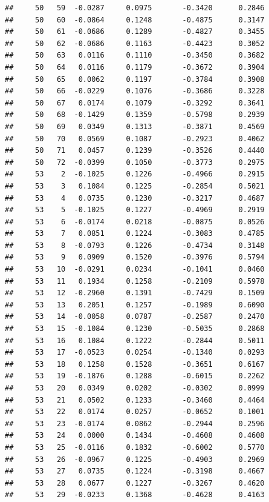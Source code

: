 \documentclass[
]{article}
\begin{document}
\begin{verbatim}
##     50   59  -0.0287     0.0975       -0.3420      0.2846  
##     50   60  -0.0864     0.1248       -0.4875      0.3147  
##     50   61  -0.0686     0.1289       -0.4827      0.3455  
##     50   62  -0.0686     0.1163       -0.4423      0.3052  
##     50   63   0.0116     0.1110       -0.3450      0.3682  
##     50   64   0.0116     0.1179       -0.3672      0.3904  
##     50   65   0.0062     0.1197       -0.3784      0.3908  
##     50   66  -0.0229     0.1076       -0.3686      0.3228  
##     50   67   0.0174     0.1079       -0.3292      0.3641  
##     50   68  -0.1429     0.1359       -0.5798      0.2939  
##     50   69   0.0349     0.1313       -0.3871      0.4569  
##     50   70   0.0569     0.1087       -0.2923      0.4062  
##     50   71   0.0457     0.1239       -0.3526      0.4440  
##     50   72  -0.0399     0.1050       -0.3773      0.2975  
##     53    2  -0.1025     0.1226       -0.4966      0.2915  
##     53    3   0.1084     0.1225       -0.2854      0.5021  
##     53    4   0.0735     0.1230       -0.3217      0.4687  
##     53    5  -0.1025     0.1227       -0.4969      0.2919  
##     53    6  -0.0174     0.0218       -0.0875      0.0526  
##     53    7   0.0851     0.1224       -0.3083      0.4785  
##     53    8  -0.0793     0.1226       -0.4734      0.3148  
##     53    9   0.0909     0.1520       -0.3976      0.5794  
##     53   10  -0.0291     0.0234       -0.1041      0.0460  
##     53   11   0.1934     0.1258       -0.2109      0.5978  
##     53   12  -0.2960     0.1391       -0.7429      0.1509  
##     53   13   0.2051     0.1257       -0.1989      0.6090  
##     53   14  -0.0058     0.0787       -0.2587      0.2470  
##     53   15  -0.1084     0.1230       -0.5035      0.2868  
##     53   16   0.1084     0.1222       -0.2844      0.5011  
##     53   17  -0.0523     0.0254       -0.1340      0.0293  
##     53   18   0.1258     0.1528       -0.3651      0.6167  
##     53   19  -0.1876     0.1288       -0.6015      0.2262  
##     53   20   0.0349     0.0202       -0.0302      0.0999  
##     53   21   0.0502     0.1233       -0.3460      0.4464  
##     53   22   0.0174     0.0257       -0.0652      0.1001  
##     53   23  -0.0174     0.0862       -0.2944      0.2596  
##     53   24   0.0000     0.1434       -0.4608      0.4608  
##     53   25  -0.0116     0.1832       -0.6002      0.5770  
##     53   26  -0.0967     0.1225       -0.4903      0.2969  
##     53   27   0.0735     0.1224       -0.3198      0.4667  
##     53   28   0.0677     0.1227       -0.3267      0.4620  
##     53   29  -0.0233     0.1368       -0.4628      0.4163  

\end{verbatim}
\end{document}
